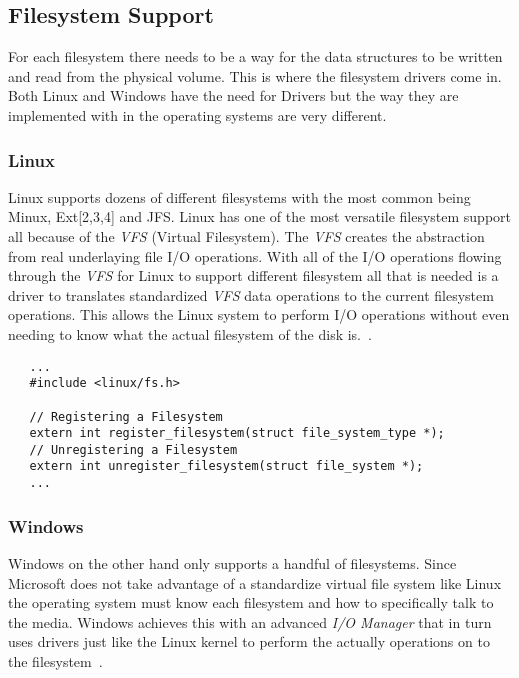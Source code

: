 \documentclass[letterpaper,10pt,notitlepage,fleqn]{article}
\begin{document}
\subsection{Filesystem Support}
For each filesystem there needs to be a way for the data structures to be written 
and read from the physical volume. This is where the filesystem drivers come 
in. Both Linux and Windows have the need for Drivers but the way they are implemented 
with in the operating systems are very different.

\subsubsection*{Linux} 
Linux supports dozens of different filesystems with the most common being Minux, Ext[2,3,4] 
and JFS. Linux has one of the most versatile filesystem support all because of the 
\textit{VFS} (Virtual Filesystem). The \textit{VFS} creates the abstraction from 
real underlaying file I/O operations. With all of the I/O operations flowing through
the \textit{VFS} for Linux to support different filesystem all that is needed is 
a driver to translates standardized \textit{VFS} data operations to the current 
filesystem operations. This allows the Linux system to perform I/O operations without 
even needing to know what the actual filesystem of the disk is.~\cite{LKD3}.
\begin{lstlisting}
   ...
   #include <linux/fs.h>

   // Registering a Filesystem
   extern int register_filesystem(struct file_system_type *);
   // Unregistering a Filesystem
   extern int unregister_filesystem(struct file_system *);
   ...
\end{lstlisting}

\subsubsection*{Windows} 
Windows on the other hand only supports a handful of filesystems. Since Microsoft 
does not take advantage of a standardize virtual file system like Linux the operating 
system must know each filesystem and how to specifically talk to the media. Windows 
achieves this with an advanced \textit{I/O Manager} that in turn uses drivers just 
like the Linux kernel to perform the actually operations on to the filesystem~\cite{WI16}. 
\end{document}
